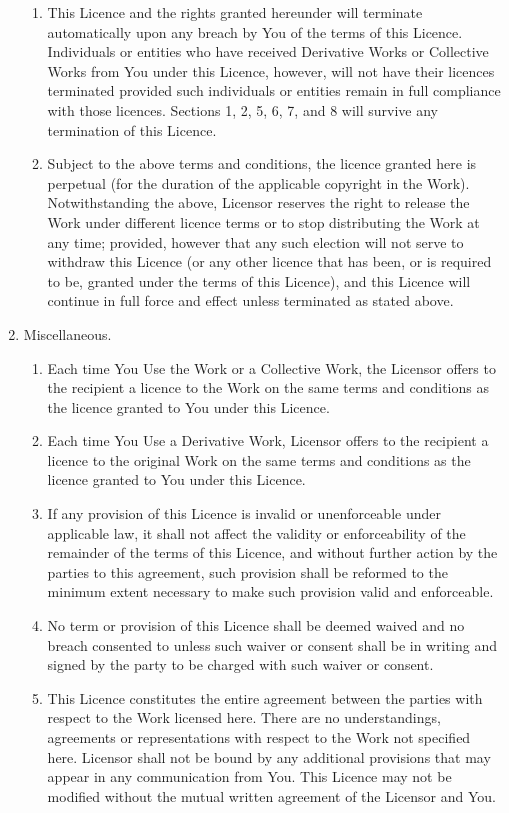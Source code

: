 \begin{enumerate}
\begin{enumerate}
         \item This Licence and the rights granted hereunder will terminate automatically upon any breach by You of the terms of this Licence. Individuals or entities who have received Derivative Works or Collective Works from You under this Licence, however, will not have their licences terminated provided such individuals or entities remain in full compliance with those licences. Sections 1, 2, 5, 6, 7, and 8 will survive any termination of this Licence.
         \item Subject to the above terms and conditions, the licence granted here is perpetual (for the duration of the applicable copyright in the Work). Notwithstanding the above, Licensor reserves the right to release the Work under different licence terms or to stop distributing the Work at any time; provided, however that any such election will not serve to withdraw this Licence (or any other licence that has been, or is required to be, granted under the terms of this Licence), and this Licence will continue in full force and effect unless terminated as stated above.
	\end{enumerate}
   \item Miscellaneous.
	\begin{enumerate}
         \item Each time You Use the Work or a Collective Work, the Licensor offers to the recipient a licence to the Work on the same terms and conditions as the licence granted to You under this Licence.
         \item Each time You Use a Derivative Work, Licensor offers to the recipient a licence to the original Work on the same terms and conditions as the licence granted to You under this Licence.
         \item If any provision of this Licence is invalid or unenforceable under applicable law, it shall not affect the validity or enforceability of the remainder of the terms of this Licence, and without further action by the parties to this agreement, such provision shall be reformed to the minimum extent necessary to make such provision valid and enforceable.
         \item No term or provision of this Licence shall be deemed waived and no breach consented to unless such waiver or consent shall be in writing and signed by the party to be charged with such waiver or consent.
         \item This Licence constitutes the entire agreement between the parties with respect to the Work licensed here. There are no understandings, agreements or representations with respect to the Work not specified here. Licensor shall not be bound by any additional provisions that may appear in any communication from You. This Licence may not be modified without the mutual written agreement of the Licensor and You.

\end{enumerate}
\end{enumerate}
